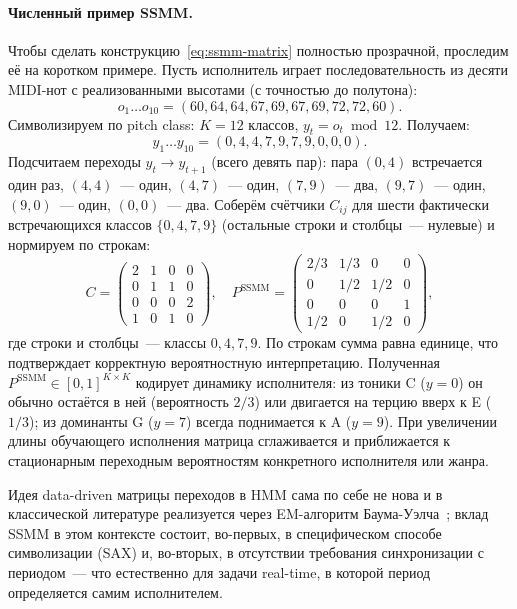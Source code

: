 \paragraph*{Численный пример SSMM.} Чтобы сделать
конструкцию~\eqref{eq:ssmm-matrix} полностью прозрачной,
проследим её на коротком примере. Пусть исполнитель играет
последовательность из десяти MIDI-нот с реализованными
высотами (с точностью до полутона):
\begin{equation*}
o_1\dots o_{10} = (60, 64, 64, 67, 69, 67, 69, 72, 72, 60).
\end{equation*}
Символизируем по pitch class: $K=12$ классов, $y_t = o_t \bmod 12$.
Получаем:
\begin{equation*}
y_1\dots y_{10} = (0, 4, 4, 7, 9, 7, 9, 0, 0, 0).
\end{equation*}
Подсчитаем переходы $y_t \to y_{t+1}$ (всего девять пар): пара
$(0,4)$ встречается один раз, $(4,4)$~--- один, $(4,7)$~--- один,
$(7,9)$~--- два, $(9,7)$~--- один, $(9,0)$~--- один, $(0,0)$~---
два. Соберём счётчики $C_{ij}$ для шести фактически встречающихся
классов $\{0, 4, 7, 9\}$ (остальные строки и столбцы~--- нулевые)
и нормируем по строкам:
\begin{equation*}
C =
\begin{pmatrix}
2 & 1 & 0 & 0 \\
0 & 1 & 1 & 0 \\
0 & 0 & 0 & 2 \\
1 & 0 & 1 & 0
\end{pmatrix},
\quad
P^{\text{SSMM}} =
\begin{pmatrix}
2/3 & 1/3 & 0 & 0 \\
0 & 1/2 & 1/2 & 0 \\
0 & 0 & 0 & 1 \\
1/2 & 0 & 1/2 & 0
\end{pmatrix},
\end{equation*}
где строки и столбцы~--- классы $0, 4, 7, 9$. По строкам сумма
равна единице, что подтверждает корректную вероятностную
интерпретацию. Полученная $P^{\text{SSMM}}\in[0,1]^{K\times K}$
кодирует динамику исполнителя:
из тоники C
($y=0$) он обычно остаётся в ней (вероятность $2/3$) или
двигается на терцию вверх к E ($1/3$); из доминанты G ($y=7$)
всегда поднимается к A ($y=9$). При увеличении длины
обучающего исполнения матрица сглаживается и приближается к
стационарным переходным вероятностям конкретного исполнителя
или жанра.

Идея
data-driven матрицы переходов в HMM сама по себе не нова и в
классической литературе реализуется через
EM-алгоритм Баума-Уэлча~\cite[\S III-C]{Rabiner1989}; вклад
SSMM в этом контексте состоит, во-первых, в специфическом
способе символизации (SAX) и, во-вторых, в отсутствии
требования синхронизации с периодом~--- что естественно для
задачи real-time, в которой период определяется самим
исполнителем.

